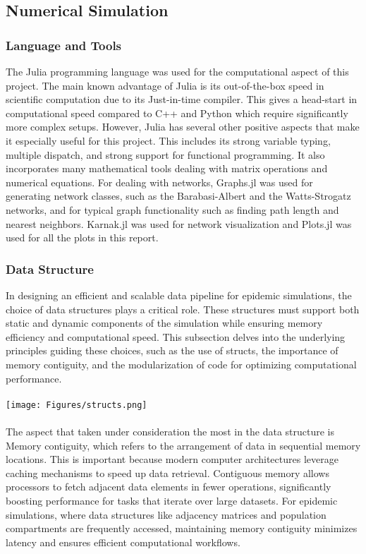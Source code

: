 \subsection{Numerical Simulation}
\subsubsection{Language and Tools}
The Julia programming language was used for the computational aspect of this project. The main known advantage of Julia is its out-of-the-box speed in scientific computation due to its  Just-in-time compiler. This gives a head-start in computational speed compared to C++ and Python which require significantly more complex setups. However, Julia has several other positive aspects that make it especially useful for this project. This includes its strong variable typing, multiple dispatch, and strong support for functional programming. It also incorporates many mathematical tools dealing with matrix operations and numerical equations. For dealing with networks, Graphs.jl was used for generating network classes, such as the Barabasi-Albert and the Watts-Strogatz networks, and for typical graph functionality such as finding path length and nearest neighbors. Karnak.jl was used for network visualization and Plots.jl was used for all the plots in this report.
\subsubsection{Data Structure}
In designing an efficient and scalable data pipeline for epidemic simulations, the choice of data structures plays a critical role. These structures must support both static and dynamic components of the simulation while ensuring memory efficiency and computational speed. This subsection delves into the underlying principles guiding these choices, such as the use of structs, the importance of memory contiguity, and the modularization of code for optimizing computational performance.\\
\\
\texttt{[image: Figures/structs.png]}
\\\\
The aspect that taken under consideration the most in the data structure is Memory contiguity, which refers to the arrangement of data in sequential memory locations. This is important because modern computer architectures leverage caching mechanisms to speed up data retrieval. Contiguous memory allows processors to fetch adjacent data elements in fewer operations, significantly boosting performance for tasks that iterate over large datasets. For epidemic simulations, where data structures like adjacency matrices and population compartments are frequently accessed, maintaining memory contiguity minimizes latency and ensures efficient computational workflows.\\

